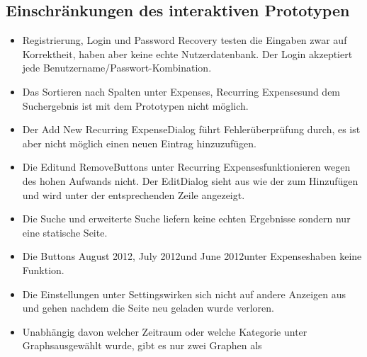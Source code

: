 \documentclass[a4paper,10pt]{article}
\begin{document}
\clearpage
\subsection{Einschr\"ankungen des interaktiven Prototypen}

\begin{itemize}
    \item Registrierung, Login und Password Recovery testen die Eingaben zwar auf
            Korrektheit, haben aber keine echte Nutzerdatenbank. Der Login akzeptiert
            jede Benutzername/Passwort-Kombination.
    \item Das Sortieren nach Spalten unter \glqq Expenses\grqq, \glqq
            Recurring Expenses\grqq\space und dem Suchergebnis ist mit dem Prototypen
            nicht m\"oglich.
    \item Der \glqq Add New Recurring Expense\grqq\space Dialog f\"uhrt
            Fehler\"uberpr\"ufung durch, es ist aber nicht m\"oglich einen neuen
            Eintrag hinzuzuf\"ugen.
    \item Die \glqq Edit\grqq\space und \glqq Remove\grqq\space Buttons unter \glqq
            Recurring Expenses\grqq\space funktionieren wegen des hohen Aufwands
            nicht. Der \glqq Edit\grqq\space Dialog sieht aus wie der zum
            Hinzuf\"ugen und wird unter der entsprechenden Zeile angezeigt.
    \item Die Suche und erweiterte Suche liefern keine echten Ergebnisse sondern nur
            eine statische Seite.
    \item Die Buttons \glqq August 2012\grqq, \glqq July 2012\grqq\space und \glqq
            June 2012\grqq\space unter \glqq Expenses\grqq\space haben keine
            Funktion.
    \item Die Einstellungen unter \glqq Settings\grqq\space wirken sich nicht auf
            andere Anzeigen aus und gehen nachdem die Seite neu geladen wurde
            verloren.
    \item Unabh\"angig davon welcher Zeitraum oder welche Kategorie unter \glqq
            Graphs\grqq\space ausgew\"ahlt wurde, gibt es nur zwei Graphen als

\end{itemize}
\end{document}
